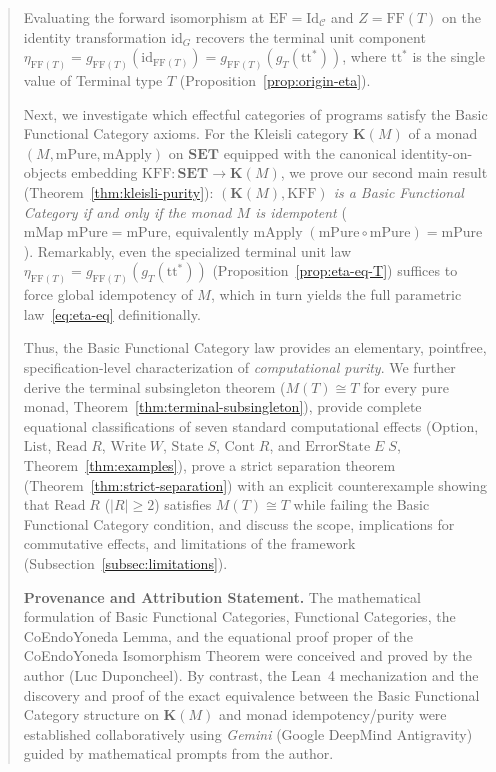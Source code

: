 \documentclass[11pt,a4paper]{article}
\theoremstyle{definition}
\theoremstyle{remark}
\newcommand{\Set}{\mathbf{SET}}
\newcommand{\Id}{\mathrm{Id}}
\newcommand{\id}{\mathrm{id}}
\newcommand{\FF}{\mathrm{FF}}
\newcommand{\KFF}{\mathrm{KFF}}
\newcommand{\EF}{\mathrm{EF}}
\newcommand{\K}{\mathbf{K}}
\newcommand{\ttstar}{\mathrm{tt}^*}
\begin{document}
\begin{abstract}
\vspace{4pt}

\noindent Evaluating the forward isomorphism at $\EF = \Id_{\mathcal{C}}$ and $Z = \FF(T)$ on the
identity transformation $\id_G$ recovers the terminal unit component
$\eta_{\FF(T)} = g_{\FF(T)}(\id_{\FF(T)}) = g_{\FF(T)}(g_T(\ttstar))$, where $\ttstar$ is the single
value of Terminal type $T$ (Proposition~\ref{prop:origin-eta}).

\vspace{4pt}

\noindent Next, we investigate which effectful categories of programs satisfy the Basic Functional
Category axioms. For the Kleisli category $\K(M)$ of a monad $(M, \mathrm{mPure}, \mathrm{mApply})$
on $\Set$ equipped with the canonical identity-on-objects embedding $\KFF : \Set \to \K(M)$, we prove
our second main result (Theorem~\ref{thm:kleisli-purity}): \emph{$(\K(M), \KFF)$ is a Basic Functional
Category if and only if the monad $M$ is idempotent} ($\mathrm{mMap}\;\mathrm{mPure} = \mathrm{mPure}$,
equivalently $\mathrm{mApply}\;(\mathrm{mPure} \circ \mathrm{mPure}) = \mathrm{mPure}$). Remarkably,
even the specialized terminal unit law $\eta_{\FF(T)} = g_{\FF(T)}(g_T(\ttstar))$
(Proposition~\ref{prop:eta-eq-T}) suffices to force global idempotency of $M$, which in turn yields the
full parametric law~\eqref{eq:eta-eq} definitionally. 

\vspace{4pt}

\noindent Thus, the Basic Functional Category law provides an elementary, pointfree,
specification-level characterization of \emph{computational purity}. We further derive the
terminal subsingleton theorem ($M(T) \cong T$ for every pure monad,
Theorem~\ref{thm:terminal-subsingleton}), provide complete equational classifications of seven
standard computational effects ($\mathrm{Option}$, $\mathrm{List}$, $\mathrm{Read}\;R$,
$\mathrm{Write}\;W$, $\mathrm{State}\;S$, $\mathrm{Cont}\;R$, and $\mathrm{ErrorState}\;E\;S$,
Theorem~\ref{thm:examples}), prove a strict separation theorem (Theorem~\ref{thm:strict-separation})
with an explicit counterexample showing that $\mathrm{Read}\;R$ ($|R| \ge 2$) satisfies
$M(T) \cong T$ while failing the Basic Functional Category condition, and discuss the scope,
implications for commutative effects, and limitations of the framework
(Subsection~\ref{subsec:limitations}).

\vspace{4pt}

\noindent \textbf{Provenance and Attribution Statement.}
The mathematical formulation of Basic Functional Categories, Functional Categories, the CoEndoYoneda
Lemma, and the equational proof proper of the CoEndoYoneda Isomorphism Theorem were conceived and
proved by the author (Luc Duponcheel). By contrast, the Lean~4
mechanization and the discovery and proof of the exact equivalence between the Basic Functional
Category structure on $\K(M)$ and monad idempotency/purity were established collaboratively
using \emph{Gemini} (Google DeepMind Antigravity) guided by mathematical prompts from the author.
\end{abstract}
\end{document}
